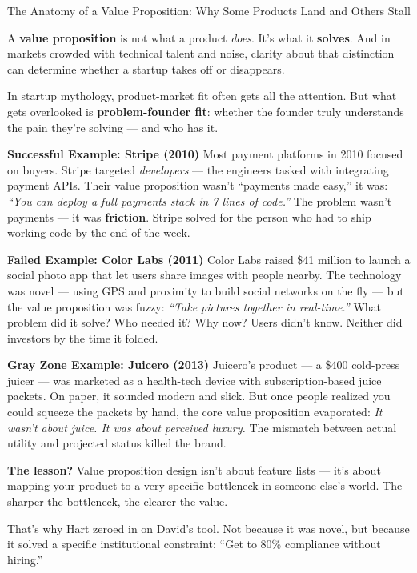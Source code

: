\begin{HistoricalSidebar}{The Anatomy of a Value Proposition: Why Some Products Land and Others Stall}

  A \textbf{value proposition} is not what a product \textit{does}. It's what it \textbf{solves}. And in markets 
  crowded with technical talent and noise, clarity about that distinction can determine whether a startup takes 
  off or disappears.
  
  \medskip
  
  In startup mythology, product-market fit often gets all the attention. But what gets overlooked is \textbf{problem-founder fit}: 
  whether the founder truly understands the pain they’re solving — and who has it.
  
  \medskip
  
  \textbf{Successful Example: Stripe (2010)}  
  Most payment platforms in 2010 focused on buyers. Stripe targeted \textit{developers} — the engineers tasked with integrating 
  payment APIs. Their value proposition wasn’t “payments made easy,” it was:  
  \textit{“You can deploy a full payments stack in 7 lines of code.”}  
  The problem wasn’t payments — it was \textbf{friction}. Stripe solved for the person who had to ship working code by the end 
  of the week.
  
  \medskip
  
  \textbf{Failed Example: Color Labs (2011)}  
  Color Labs raised \$41 million to launch a social photo app that let users share images with people nearby. The technology 
  was novel — using GPS and proximity to build social networks on the fly — but the value proposition was fuzzy:  
  \textit{“Take pictures together in real-time.”}  
  What problem did it solve? Who needed it? Why now? Users didn’t know. Neither did investors by the time it folded.
  
  \medskip
  
  \textbf{Gray Zone Example: Juicero (2013)}  
  Juicero’s product — a \$400 cold-press juicer — was marketed as a health-tech device with subscription-based juice packets. 
  On paper, it sounded modern and slick. But once people realized you could squeeze the packets by hand, the core value 
  proposition evaporated:  
  \textit{It wasn't about juice. It was about perceived luxury.}  
  The mismatch between actual utility and projected status killed the brand.
  
  \medskip
  
  \textbf{The lesson?}  
  Value proposition design isn’t about feature lists — it’s about mapping your product to a very specific bottleneck in someone 
  else’s world. The sharper the bottleneck, the clearer the value.
  
  \medskip
  
  That’s why Hart zeroed in on David’s tool. Not because it was novel, but because it solved a specific institutional constraint:  
  “Get to 80\% compliance without hiring.”
  
\end{HistoricalSidebar}

